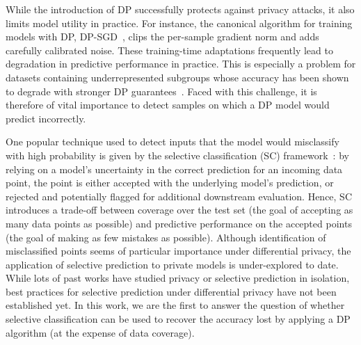 While the introduction of DP successfully protects against privacy attacks, it also limits model utility in practice. For instance, the canonical algorithm for training models with DP, DP-SGD~\citep{abadi2016deep}, clips the per-sample gradient norm and adds carefully calibrated noise. These training-time adaptations frequently lead to degradation in predictive performance in practice. This is especially a problem for datasets containing underrepresented subgroups whose accuracy has been shown to degrade with stronger DP guarantees~\citep{bagdasaryan2019differential}. Faced with this challenge, it is therefore of vital importance to detect samples on which a DP model would predict incorrectly.%

One popular technique used to detect inputs that the model would misclassify with high probability is given by the selective classification (SC) framework~\citep{geifman2017selective}: by relying on a model's uncertainty in the correct prediction for an incoming data point, the point is either accepted with the underlying model's prediction, or rejected and potentially flagged for additional downstream evaluation. Hence, SC introduces a trade-off between coverage over the test set (\ie the goal of accepting as many data points as possible) and predictive performance on the accepted points (\ie the goal of making as few mistakes as possible). 
Although identification of misclassified points seems of particular importance under differential privacy, the application of selective prediction to private models is under-explored to date. While lots of past works have studied privacy or selective prediction in isolation, best practices for selective prediction under differential privacy have not been established yet. In this work, we are the first to answer the question of whether selective classification can be used to recover the accuracy lost by applying a DP algorithm (at the expense of data coverage).




